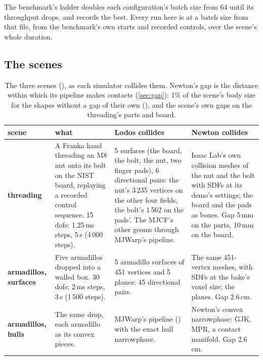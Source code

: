 The benchmark's ladder doubles each configuration's batch size from 64 until its throughput drops, and  records the best. Every run here is at a batch size from that file, from the benchmark's own starts and recorded controls, over the scene's whole duration.

\subsection{The scenes}\label{sec:scenes}

\begin{table}[t]
\centering
\caption{The three scenes (), as each simulator collides them. Newton's gap is the distance within which its pipeline makes contacts (\cref{sec:gap}): 1\% of the scene's body size for the shapes without a gap of their own (), and the scene's own gaps on the threading's parts and board.}
\label{tab:scenes}
\small
\begin{tabularx}{\linewidth}{@{}L{27mm}YYY@{}}
\toprule
scene & what & Lodos collides & Newton collides \\
\midrule
\textbf{threading}  & A Franka hand threading an M8 nut onto its bolt on the NIST board, replaying a recorded control sequence. 15 dofs; 1.25\,ms steps, 5\,s (4\,000 steps). & 5 surfaces (the board, the bolt, the nut, two finger pads), 6 directional pairs: the nut's 3\,235 vertices on the other four fields, the bolt's 1\,562 on the pads'. The MJCF's other geoms through MJWarp's pipeline. & Isaac Lab's own collision meshes of the nut and the bolt with SDFs at its demo's settings; the board and the pads as boxes. Gap 5\,mm on the parts, 10\,mm on the board. \\
\textbf{armadillos, surfaces}  & Five armadillos dropped into a walled box. 30 dofs; 2\,ms steps, 3\,s (1\,500 steps). & 5 armadillo surfaces of 451 vertices and 5 planes: 45 directional pairs. & The same 451-vertex meshes, with SDFs at the bake's voxel size; the planes. Gap 2.6\,cm. \\
\textbf{armadillos, hulls}  & The same drop, each armadillo as its convex pieces. & MJWarp's pipeline () with the exact hull narrowphase. & Newton's convex narrowphase: GJK, MPR, a contact manifold. Gap 2.6\,cm. \\
\bottomrule
\end{tabularx}
\end{table}

